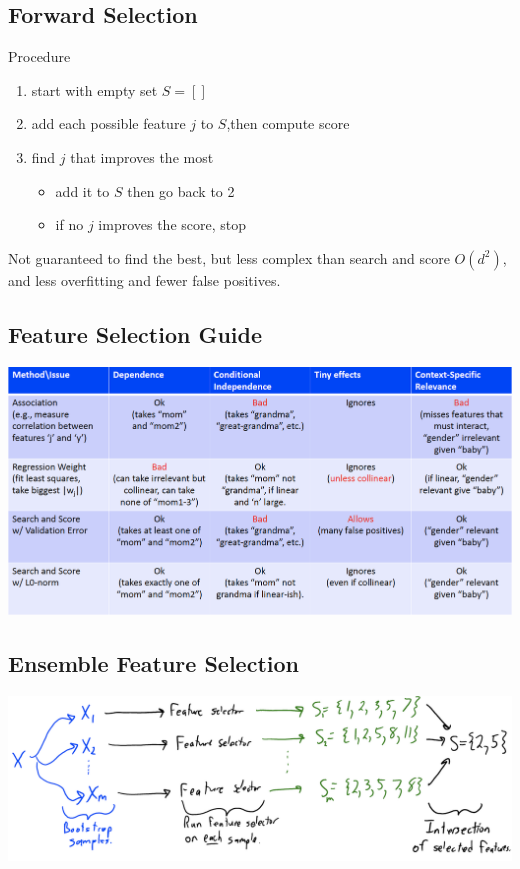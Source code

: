 \documentclass[10pt,landscape,a4paper]{article}
\begin{document}
\begin{multicols*}{5}
\subsection{Forward Selection}
Procedure
\begin{enumerate}
    \item start with empty set \(S = []\)
    \item add each possible feature \(j\) to \(S\),then compute score
    \item find \(j\) that improves the most
    \begin{itemize}
        \item add it to \(S\) then go back to 2
        \item if no \(j\) improves the score, stop
    \end{itemize}
\end{enumerate}
Not guaranteed to find the best, but less complex than search and score \(O(d^2)\), and less overfitting and fewer false positives.

\subsection{Feature Selection Guide}
\includegraphics[scale=0.12]{feature_selection_guide}

\subsection{Ensemble Feature Selection}
\includegraphics[scale=0.12]{ensemble_feature_selection}


\end{multicols*}
\end{document}

